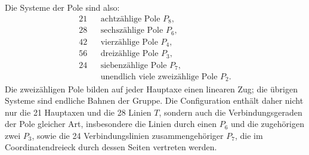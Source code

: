 \documentclass[11pt]{article}
\begin{document}
Die Systeme der Pole sind also:
\begin{equation}
\begin{array}{rcl}
21&&\text{achtzählige Pole }P_8,\\
28&&\text{sechszählige Pole }P_6,\\
42&&\text{vierzählige Pole }P_4,\\
56&&\text{dreizählige Pole }P_3,\\
24&&\text{siebenzählige Pole }P_7,\\
&&\text{unendlich viele zweizählige Pole }P_2.
\end{array}
\tag{2}
\end{equation}
Die zweizähligen Pole bilden auf jeder Hauptaxe einen linearen Zug; die übrigen Systeme sind endliche Bahnen der Gruppe. Die Configuration enthält daher nicht nur die 21 Hauptaxen und die 28 Linien \(T\), sondern auch die Verbindungsgeraden der Pole gleicher Art, insbesondere die Linien durch einen \(P_6\) und die zugehörigen zwei \(P_3\), sowie die 24 Verbindungslinien zusammengehöriger \(P_7\), die im Coordinatendreieck durch dessen Seiten vertreten werden.

\clearpage
\end{document}
